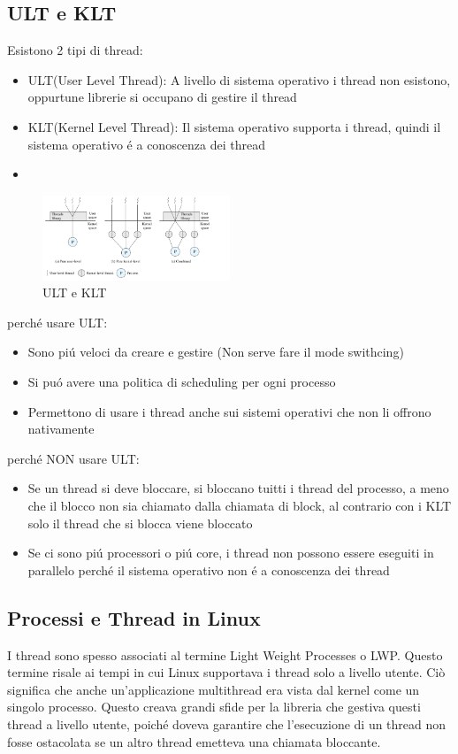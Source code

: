 \subsection{ULT e KLT}
Esistono 2 tipi di thread:
\begin{itemize}
    \item ULT(User Level Thread): A livello di sistema operativo i thread non esistono, oppurtune librerie si occupano di gestire il thread
    \item KLT(Kernel Level Thread): Il sistema operativo supporta i thread, quindi il sistema operativo é a conoscenza dei thread
    \item
\end{itemize}
\begin{figure}[H]
    \centering
    \includegraphics[width=0.5\textwidth]{immagini/ULTeKLT}
    \caption{ULT e KLT}
\end{figure}
perché usare ULT:
\begin{itemize}
    \item Sono piú veloci da creare e gestire (Non serve fare il mode swithcing)
    \item Si puó avere una politica di scheduling per ogni processo
    \item Permettono di usare i thread anche sui sistemi operativi che non li offrono nativamente
\end{itemize}
perché NON usare ULT:
\begin{itemize}
    \item Se un thread si deve bloccare, si bloccano tuitti i thread del processo, a meno che il blocco non sia chiamato
    dalla chiamata di block, al contrario con i KLT solo il thread che si blocca viene bloccato
    \item Se ci sono piú processori o piú core, i thread non possono essere eseguiti in parallelo perché il sistema operativo
    non é a conoscenza dei thread
\end{itemize}
\subsection{Processi e Thread in Linux}

I thread sono spesso associati al termine Light Weight Processes o LWP. Questo termine risale ai tempi in cui Linux supportava i thread solo a livello utente. Ciò significa che anche un'applicazione multithread era vista dal kernel come un singolo processo. Questo creava grandi sfide per la libreria che gestiva questi thread a livello utente, poiché doveva garantire che l'esecuzione di un thread non fosse ostacolata se un altro thread emetteva una chiamata bloccante.

